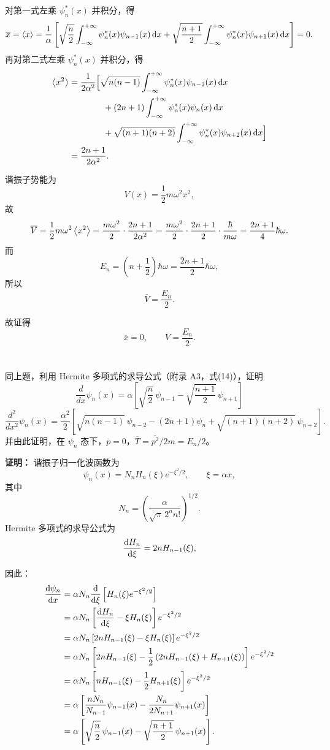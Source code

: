 \documentclass[12pt,a4paper]{article}
\begin{document}
对第一式左乘 \(\psi_n^*(x)\) 并积分，得
\[
\overline{x}=\ev{x}
=
\frac{1}{\alpha}\left[
\sqrt{\frac{n}{2}}\int_{-\infty}^{+\infty}\psi_n^*(x)\psi_{n-1}(x)\, \dd x
+
\sqrt{\frac{n+1}{2}}\int_{-\infty}^{+\infty}\psi_n^*(x)\psi_{n+1}(x)\, \dd x
\right]
=0.
\]
再对第二式左乘 \(\psi_n^*(x)\) 并积分，得
\begin{align*}
\ev{x^2}
&=
\frac{1}{2\alpha^2}\Bigl[
\sqrt{n(n-1)}\int_{-\infty}^{+\infty}\psi_n^*(x)\psi_{n-2}(x)\,\dd x \\
&\qquad\qquad
+ (2n+1)\int_{-\infty}^{+\infty}\psi_n^*(x)\psi_n(x)\,\dd x \\
&\qquad\qquad
+ \sqrt{(n+1)(n+2)}\int_{-\infty}^{+\infty}\psi_n^*(x)\psi_{n+2}(x)\,\dd x
\Bigr] \\
&= \frac{2n+1}{2\alpha^2}.
\end{align*}

谐振子势能为
\[
V(x)=\frac{1}{2}m\omega^2x^2,
\]
故
\[
\overline{V}=\frac{1}{2}m\omega^2\ev{x^2}
=\frac{m\omega^2}{2}\cdot\frac{2n+1}{2\alpha^2}
=\frac{m\omega^2}{2}\cdot\frac{2n+1}{2}\cdot\frac{\hbar}{m\omega}
=\frac{2n+1}{4}\hbar\omega.
\]
而
\[
E_n=\left(n+\frac{1}{2}\right)\hbar\omega=\frac{2n+1}{2}\hbar\omega,
\]
所以
\[
\overline{V}=\frac{E_n}{2}.
\]

故证得
\[
\overline{x}=0,
\qquad
\overline{V}=\frac{E_n}{2}.
\]

\section{}
同上题，利用 Hermite 多项式的求导公式（附录 A3，式(14)），证明
\[
\frac{d}{dx}\psi_n(x)=\alpha\left[\sqrt{\frac{n}{2}}\,\psi_{n-1}-\sqrt{\frac{n+1}{2}}\,\psi_{n+1}\right]
\]
\[
\frac{d^2}{dx^2}\psi_n(x)=\frac{\alpha^2}{2}\left[\sqrt{n(n-1)}\,\psi_{n-2}-(2n+1)\psi_n+\sqrt{(n+1)(n+2)}\,\psi_{n+2}\right].
\]
并由此证明，在 $\psi_n$ 态下，$\overline{p}=0$，$\overline{T}=\overline{p^2}/2m=E_n/2$。

\vspace{0.5cm}

\noindent\textbf{证明：}
谐振子归一化波函数为
\[
\psi_n(x)=N_n H_n(\xi)e^{-\xi^2/2},
\qquad
\xi=\alpha x,
\]
其中
\[
N_n=\left(\frac{\alpha}{\sqrt{\pi}\,2^n n!}\right)^{1/2}.
\]
Hermite 多项式的求导公式为
\[
\dv{H_n}{\xi}=2nH_{n-1}(\xi),
\]

因此：
\begin{align*}
\dv{\psi_n}{x}
&=\alpha N_n \dv{\xi}\left[ H_n(\xi)e^{-\xi^2/2} \right] \\
&=\alpha N_n \left[ \dv{H_n}{\xi}-\xi H_n(\xi) \right] e^{-\xi^2/2} \\
&=\alpha N_n \left[ 2nH_{n-1}(\xi)-\xi H_n(\xi) \right] e^{-\xi^2/2} \\
&=\alpha N_n \left[ 2nH_{n-1}(\xi)-\frac{1}{2}\left( 2nH_{n-1}(\xi)+H_{n+1}(\xi) \right) \right] e^{-\xi^2/2} \\
&=\alpha N_n \left[ nH_{n-1}(\xi)-\frac{1}{2}H_{n+1}(\xi) \right] e^{-\xi^2/2} \\
&=\alpha\left[ \frac{nN_n}{N_{n-1}}\psi_{n-1}(x)-\frac{N_n}{2N_{n+1}}\psi_{n+1}(x) \right] \\
&=\alpha\left[ \sqrt{\frac{n}{2}}\,\psi_{n-1}(x)-\sqrt{\frac{n+1}{2}}\,\psi_{n+1}(x) \right].
\end{align*}
\end{document}
